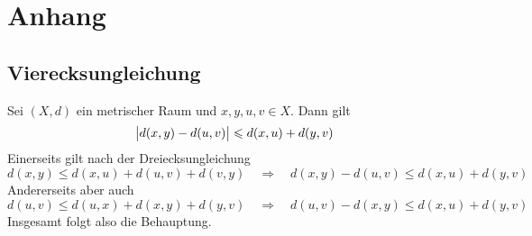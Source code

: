 \cleardoubleoddemptypage
\appendix
\section{Anhang} %
\label{sec:anhang}

\subsection{Vierecksungleichung} %
\label{sub:vier_ungl}
Sei $(X,d)$ ein metrischer Raum und $x,y,u,v \in X$. Dann gilt
\[
	\abs[\big]{d(x,y) - d(u,v)} \le d(x,u) + d(y,v) 
\]
Einerseits gilt nach der Dreiecksungleichung
\[
	d(x,y) \le d(x,u) + d(u,v) + d(v,y) \quad \Longrightarrow \quad d(x,y) - d(u,v) \le d(x,u) + d(y,v)
\]
Andererseits aber auch
\[
	d(u,v) \le d(u,x) + d(x,y) + d(y,v) \quad \Longrightarrow \quad d(u,v) - d(x,y) \le d(x,u) + d(y,v)
\]
Insgesamt folgt also die Behauptung. \bewende

\cleardoubleoddemptypage
{}
\setcounter{page}{1}
\printindex
\listoffigures
\todototoc
{}
